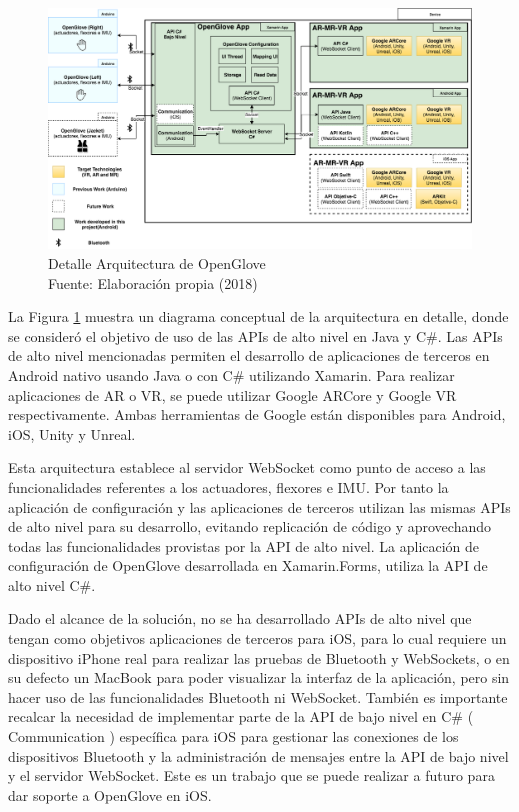 \begin{figure}[H]
  \begin{center} 
   	\includegraphics[width=1.0\textwidth]{images/chapter04/OpenGlove-Architecture-Specification.png} 
    \caption[Detalle Arquitectura de Openglove]{Detalle Arquitectura de OpenGlove \\Fuente: Elaboración propia (2018)}
    \label{fig:detalle-arquitectura-open-glove}
  \end{center}
\end{figure}

La Figura \ref{fig:detalle-arquitectura-open-glove} muestra un diagrama conceptual de la arquitectura en detalle, donde se consideró el objetivo de uso de las APIs de alto nivel en Java y C\#. Las APIs de alto nivel mencionadas permiten el desarrollo de aplicaciones de terceros en Android nativo usando Java o con C\# utilizando Xamarin. Para realizar aplicaciones de AR o VR, se puede utilizar Google ARCore y Google VR respectivamente. Ambas herramientas de Google están disponibles para Android, iOS, Unity y Unreal.

Esta arquitectura establece al servidor WebSocket como punto de acceso a las funcionalidades referentes a los actuadores, flexores e IMU. Por tanto la aplicación de configuración y las aplicaciones de terceros utilizan las mismas APIs de alto nivel para su desarrollo, evitando replicación de código y aprovechando todas las funcionalidades provistas por la API de alto nivel. La aplicación de configuración de OpenGlove desarrollada en Xamarin.Forms, utiliza la API de alto nivel C\#.

Dado el alcance de la solución, no se ha desarrollado APIs de alto nivel que tengan como objetivos aplicaciones de terceros para iOS, para lo cual requiere un dispositivo iPhone real para realizar las pruebas de Bluetooth y WebSockets, o en su defecto un MacBook para poder visualizar la interfaz de la aplicación, pero sin hacer uso de las funcionalidades Bluetooth ni WebSocket. También es importante recalcar la necesidad de implementar parte de la API de bajo nivel en C\# ( Communication ) específica para iOS para gestionar las conexiones de los dispositivos Bluetooth y la administración de mensajes entre la API de bajo nivel y el servidor WebSocket. Este es un trabajo que se puede realizar a futuro para dar soporte a OpenGlove en iOS.



